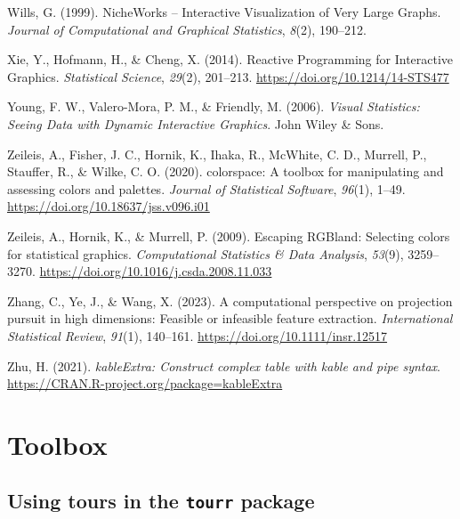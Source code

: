 \documentclass[
  letterpaper,
]{book}
\newlength{\cslhangindent}
\newlength{\cslentryspacingunit} %
\newenvironment{CSLReferences}[2] %
 {%
  \setlength{\parindent}{0pt}
  \ifodd #1
  \let\oldpar\par
  \def\par{\hangindent=\cslhangindent\oldpar}
  \fi
  \setlength{\parskip}{#2\cslentryspacingunit}
 }%
 {}
\begin{document}
\begin{CSLReferences}{1}{0}
\leavevmode{}%
Wills, G. (1999). NicheWorks -- {I}nteractive {V}isualization of {V}ery
{L}arge {G}raphs. \emph{Journal of Computational and Graphical
Statistics}, \emph{8}(2), 190--212.

\leavevmode{}%
Xie, Y., Hofmann, H., \& Cheng, X. (2014). {Reactive Programming for
Interactive Graphics}. \emph{Statistical Science}, \emph{29}(2),
201--213. \url{https://doi.org/10.1214/14-STS477}

\leavevmode{}%
Young, F. W., Valero-Mora, P. M., \& Friendly, M. (2006). \emph{Visual
{S}tatistics: {S}eeing {D}ata with {D}ynamic {I}nteractive {G}raphics}.
John Wiley \& Sons.

\leavevmode{}%
Zeileis, A., Fisher, J. C., Hornik, K., Ihaka, R., McWhite, C. D.,
Murrell, P., Stauffer, R., \& Wilke, C. O. (2020). {colorspace}: A
toolbox for manipulating and assessing colors and palettes.
\emph{Journal of Statistical Software}, \emph{96}(1), 1--49.
\url{https://doi.org/10.18637/jss.v096.i01}

\leavevmode{}%
Zeileis, A., Hornik, K., \& Murrell, P. (2009). Escaping {RGB}land:
Selecting colors for statistical graphics. \emph{Computational
Statistics \& Data Analysis}, \emph{53}(9), 3259--3270.
\url{https://doi.org/10.1016/j.csda.2008.11.033}

\leavevmode{}%
Zhang, C., Ye, J., \& Wang, X. (2023). A computational perspective on
projection pursuit in high dimensions: Feasible or infeasible feature
extraction. \emph{International Statistical Review}, \emph{91}(1),
140--161. \url{https://doi.org/10.1111/insr.12517}

\leavevmode{}%
Zhu, H. (2021). \emph{kableExtra: Construct complex table with kable and
pipe syntax}. \url{https://CRAN.R-project.org/package=kableExtra}

\end{CSLReferences}

\appendix
{}

\hypertarget{toolbox}{%
\chapter{Toolbox}\label{toolbox}}

\hypertarget{using-tours-in-the-tourr-package}{%
\section{\texorpdfstring{Using tours in the \texttt{tourr}
package}{Using tours in the tourr package}}\label{using-tours-in-the-tourr-package}}
\end{document}
